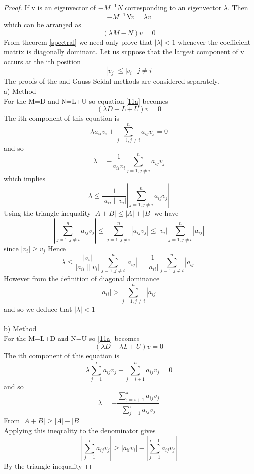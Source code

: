 \begin{proof}
If v is an eigenvector of $-M^{-1}N$ corresponding to an eigenvector $\lambda$. Then
\[-M^{-1}Nv=\lambda v\]
which can be arranged as
\begin{equation}
\label{11a}
(\lambda M-N)v=0
\end{equation}
From theorem \ref{spectral} we need only prove that $|\lambda|<1$ whenever the coefficient
matrix is diagonally dominant.  Let us suppose that the largest component of v
occurs at the ith position
\[|v_{j}| \leq |v_{i}| \ \ j\not= i 
\]
The proofs of the  and Gauss-Seidal methods are considered separately.\\
a)  Method\\
For the  M=D and N=L+U so equation \ref{11a} becomes
\[(\lambda D +L+U)v=0\]
The ith component of this equation is
\[ \lambda a_{ii}v_i + \sum_{j=1,j\not=i}^{n}a_{ij}v_j=0 \]
and so
\[ \lambda = - \frac{1}{a_{ii}v_i } \sum_{j=1,j\not=i}^{n}a_{ij}v_j\]
which implies 
\[ \lambda \leq \frac{1}{|a_{ii}\lVert v_i| } |\sum_{j=1,j\not=i}^{n}a_{ij}v_j|\]
Using the triangle inequality $|A+B| \leq |A|+|B|$ we have
\[|\sum_{j=1,j\not=i}^{n}a_{ij}v_j|\leq \sum_{j=1,j\not=i}^{n}|a_{ij}v_{j}|
\leq |v_i| \sum_{j=1,j\not=i}^{n} |a_{ij}| \]
since $|v_i| \geq v_j $
Hence
\[ \lambda \leq \frac{|v_i|}{|a_{ii}\lVert v_i| } \sum_{j=1,j\not=i}^{n}|a_{ij}|=
\frac{1}{|a_{ii}| } \sum_{j=1,j\not=i}^{n}|a_{ij}|\]
However from the definition of diagonal dominance
\[ |a_{ii}| > \sum_{j=1,j\not=i}^{n}|a_{ij}| \]
and so we deduce that $|\lambda|< 1 $\\
\\
b) Method\\
For the M=L+D and N=U so \ref{11a} becomes
\[(\lambda D +\lambda L+U)v=0\]
The ith component of this equation is
\[ \lambda \sum_{j=1}^{i}a_{ij}v_j + \sum_{j=i+1}^{n}a_{ij}v_j=0 \]
and so
\begin{equation}
\label{A}
 \lambda =-\frac{\sum_{j=i+1}^{n}a_{ij}v_j}{ \sum_{j=1}^{i}a_{ij}v_j}
\end{equation}
From $|A+B| \geq |A| - |B| $\\
Applying this inequality to the denominator gives
\[ \left|\sum_{j=1}^{i}a_{ij}v_j \right| \geq |a_{ii}v_{i}| -\left|\sum_{j=1}^{i-1}a_{ij}v_j \right| \]
By the triangle inequality


\end{proof}
